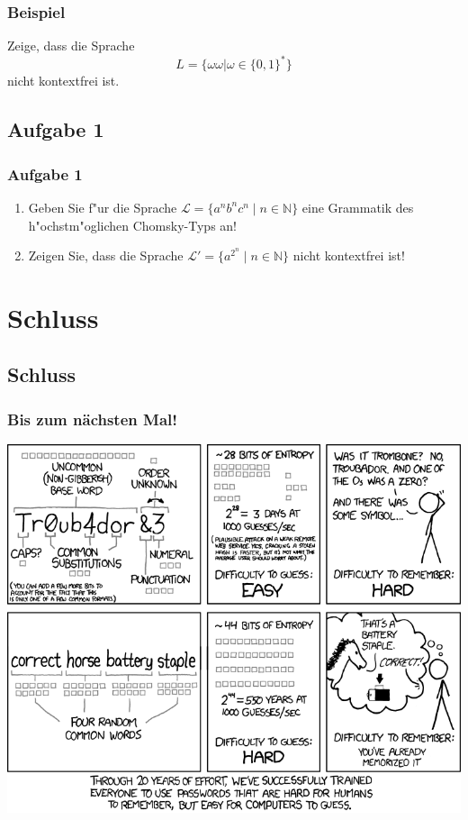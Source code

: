 \begin{frame}
	\frametitle{Beispiel}
	Zeige, dass die Sprache
	\[L=\{\omega \omega|\omega \in \{0,1\}^*\}\]
	nicht kontextfrei ist.
\end{frame}

\subsection{Aufgabe 1}
\begin{frame}
	\frametitle{Aufgabe 1}
	\begin{enumerate}
		\item Geben Sie f"ur die Sprache $\mathcal{L} = \{a^nb^nc^n \; | \; n \in
		\mathbb{N}\}$ eine Grammatik des h"ochstm"oglichen Chomsky-Typs an!
		\item Zeigen Sie, dass die Sprache $\mathcal{L}' = \{a^{2^n} \; | \; n \in
		\mathbb{N}\}$ nicht kontextfrei ist!
	\end{enumerate}
\end{frame}

\section{Schluss}
\subsection{Schluss}

\begin{frame}
\frametitle{Bis zum nächsten Mal!}
\begin{center}
  \includegraphics[width=1 \textheight]{images/password_strength.png}
\end{center}
\end{frame}

